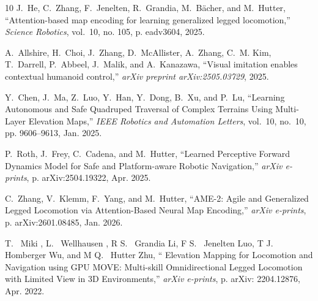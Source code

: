 \documentclass[letterpaper, 10 pt, conference]{ieeeconf/ieeeconf}
\providecommand{\DIFadd}[1]{{\protect\color{blue} \sf #1}} %
\providecommand{\DIFdel}[1]{{\protect\color{red} \scriptsize #1}} %
\providecommand{\DIFaddbegin}{} %
\providecommand{\DIFaddend}{} %
\providecommand{\DIFdelbegin}{} %
\providecommand{\DIFdelend}{} %
\begin{document}
\begin{thebibliography}{10}
J.~He, C.~Zhang, F.~Jenelten, R.~Grandia, M.~B{\"a}cher, and M.~Hutter,
  ``Attention-based map encoding for learning generalized legged locomotion,''
  \emph{Science Robotics}, vol.~10, no. 105, p. eadv3604, 2025.

A.~Allshire, H.~Choi, J.~Zhang, D.~McAllister, A.~Zhang, C.~M. Kim, T.~Darrell,
  P.~Abbeel, J.~Malik, and A.~Kanazawa, ``Visual imitation enables contextual
  humanoid control,'' \emph{arXiv preprint arXiv:2505.03729}, 2025.

Y.~{Chen}, J.~{Ma}, Z.~{Luo}, Y.~{Han}, Y.~{Dong}, B.~{Xu}, and P.~{Lu},
  ``{Learning Autonomous and Safe Quadruped Traversal of Complex Terrains Using
  Multi-Layer Elevation Maps},'' \emph{IEEE Robotics and Automation Letters},
  vol.~10, no.~10, pp. 9606--9613, Jan. 2025.

P.~{Roth}, J.~{Frey}, C.~{Cadena}, and M.~{Hutter}, ``{Learned Perceptive
  Forward Dynamics Model for Safe and Platform-aware Robotic Navigation},''
  \emph{arXiv e-prints}, p. arXiv:2504.19322, Apr. 2025.

C.~{Zhang}, V.~{Klemm}, F.~{Yang}, and M.~{Hutter}, ``{AME-2: Agile and
  Generalized Legged Locomotion via Attention-Based Neural Map Encoding},''
  \emph{arXiv e-prints}, p. arXiv:2601.08485, Jan. 2026.

\DIFdelbegin {}
\DIFdel{T.~}%
\DIFdel{Miki}%
\DIFdel{, L.~}%
\DIFdel{Wellhausen}%
\DIFdel{, R}\DIFdelend \DIFaddbegin {}
\DIFadd{S}\DIFaddend .~{\DIFdelbegin \DIFdel{Grandia}\DIFdelend \DIFaddbegin \DIFadd{Li}\DIFaddend }, \DIFdelbegin \DIFdel{F}\DIFdelend \DIFaddbegin \DIFadd{S}\DIFaddend .~{\DIFdelbegin \DIFdel{Jenelten}\DIFdelend \DIFaddbegin \DIFadd{Luo}\DIFaddend }, \DIFdelbegin \DIFdel{T}\DIFdelend \DIFaddbegin \DIFadd{J}\DIFaddend .~{\DIFdelbegin \DIFdel{Homberger}\DIFdelend \DIFaddbegin \DIFadd{Wu}\DIFaddend }, and \DIFdelbegin \DIFdel{M}\DIFdelend \DIFaddbegin \DIFadd{Q}\DIFaddend .~{\DIFdelbegin \DIFdel{Hutter}\DIFdelend \DIFaddbegin \DIFadd{Zhu}\DIFaddend }, ``{\DIFdelbegin \DIFdel{Elevation Mapping for Locomotion and Navigation using GPU}\DIFdelend \DIFaddbegin \DIFadd{MOVE: Multi-skill Omnidirectional
  Legged Locomotion with Limited View in 3D Environments}\DIFaddend },'' \emph{arXiv
  e-prints}, p. arXiv:\DIFdelbegin \DIFdel{2204.12876, Apr. 2022.
}%


\end{thebibliography}
\end{document}
